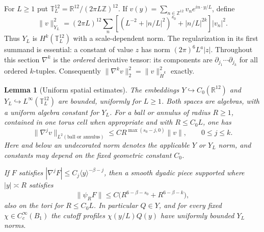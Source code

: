 \documentclass[11pt]{article}
\numberwithin{equation}{section}
\newtheorem{lemma}[theorem]{Lemma}
\theoremstyle{definition}
\theoremstyle{remark}
\begin{document}
For $L\ge1$ put $\mathbb T_L^{12}=\mathbb R^{12}/(2\pi L\mathbb Z)^{12}$.
If $v(y)=\sum_{n\in\mathbb Z^{12}}v_ne^{in\cdot y/L}$, define
\begin{equation}\label{lin:YL}
 \|v\|_{Y_L}^2=(2\pi L)^{12}\sum_n
 \left[(L^{-2}+|n/L|^2)^{s_0}+|n/L|^{2k}\right]|v_n|^2.
\end{equation}
Thus $Y_L$ is $H^k(\mathbb T_L^{12})$ with a scale-dependent norm.
The regularization in its first summand is essential: a constant of value
$z$ has norm $(2\pi)^6L^a|z|$.
Throughout this section $\nabla^k$ is the \emph{ordered} derivative tensor:
its components are $\partial_{j_1}\cdots\partial_{j_k}$ for all ordered
$k$-tuples.  Consequently
$\|\nabla^kv\|_2^2=\|v\|_{\dot H^k}^2$ exactly.

\begin{lemma}[Uniform spatial estimates]\label{lin:spatial}
The embeddings $Y\hookrightarrow C_0(\mathbb R^{12})$ and
$Y_L\hookrightarrow L^\infty(\mathbb T_L^{12})$ are bounded, uniformly for
$L\ge1$.  Both spaces are algebras, with a uniform algebra constant for
$Y_L$.  For a ball or annulus of radius $R\ge1$, contained in one torus
cell when appropriate and with $R\le C_0L$, one has
\begin{equation}\label{lin:local-derivatives}
 \|\nabla^jv\|_{L^2(\text{ball or annulus})}
 \le C R^{\max(s_0-j,0)}\|v\|,
 \qquad 0\le j\le k.
\end{equation}
Here and below an undecorated norm denotes the applicable $Y$ or $Y_L$
norm, and constants may depend on the fixed geometric constant $C_0$.

If $F$ satisfies $|\nabla^jF|\le C_j\langle y\rangle^{-\beta-j}$, then
a smooth dyadic piece supported where $|y|\asymp R$ satisfies
\begin{equation}\label{lin:symbol-norm}
 \|\psi_RF\|\le C\big(R^{6-\beta-s_0}+R^{6-\beta-k}\big),
\end{equation}
also on the tori for $R\le C_0L$.  In particular $Q\in Y$, and for every
fixed $\chi\in C_c^\infty(B_1)$ the cutoff profiles $\chi(y/L)Q(y)$
have uniformly bounded $Y_L$ norms.
\end{lemma}
\end{document}
